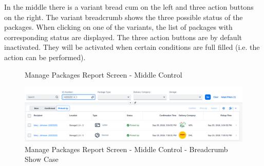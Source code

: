 In the middle there is a variant bread cum on the left and three action buttons on the right. The variant breadcrumb shows the three possible status of the packages. When clicking on one of the variants, the list of packages with corresponding status are displayed. The three action buttons are by default inactivated. They will be activated when certain conditions are full filled (i.e. the action can be performed).

\begin{figure}[H]
	\centering
	\hspace{5pt}
  \caption{Manage Packages Report Screen - Middle Control}
	\label{fig:MPMiddle}
\end{figure}

\begin{figure}[H]
	\centering
	\includegraphics[width=1\linewidth]{images/user_doc/managePack/ReportScreen/browse/defaultFreeTextIdUsage.png}
	\caption{Manage Packages Report Screen - Middle Control - Breadcrumb Show Case}
	\label{fig:MPIDFIlter}
\end{figure}


